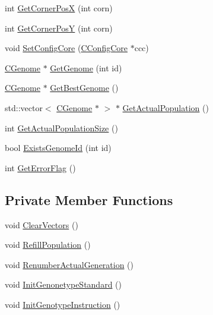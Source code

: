 \begin{DoxyCompactItemize}
\item 
int \hyperlink{classCGeneticAlgorithm_a7ed37537336f7ba8c77b8944e0a9052a}{GetCornerPosX} (int corn)
\item 
int \hyperlink{classCGeneticAlgorithm_afff003459489277c5b3944677b589a2b}{GetCornerPosY} (int corn)
\item 
void \hyperlink{classCGeneticAlgorithm_aa3b7378230c783d13431d50eaf3600c9}{SetConfigCore} (\hyperlink{classCConfigCore}{CConfigCore} $\ast$ccc)
\item 
\hyperlink{classCGenome}{CGenome} $\ast$ \hyperlink{classCGeneticAlgorithm_a85a3227b126b529d21b503e48fcf30ef}{GetGenome} (int id)
\item 
\hyperlink{classCGenome}{CGenome} $\ast$ \hyperlink{classCGeneticAlgorithm_a3fe743e1c6ca8f2387410063ce42fb5c}{GetBestGenome} ()
\item 
std::vector$<$ \hyperlink{classCGenome}{CGenome} $\ast$ $>$ $\ast$ \hyperlink{classCGeneticAlgorithm_a4066729944a04f47bf4c38257d330cb3}{GetActualPopulation} ()
\item 
int \hyperlink{classCGeneticAlgorithm_ad320e9d2f781d4f503f4edf66b6abc07}{GetActualPopulationSize} ()
\item 
bool \hyperlink{classCGeneticAlgorithm_a443bd2417f915c0aeb8119ff86844ad4}{ExistsGenomeId} (int id)
\item 
int \hyperlink{classCGeneticAlgorithm_a73bfc748e3d504395e6180d363a24536}{GetErrorFlag} ()
\end{DoxyCompactItemize}
\subsection*{Private Member Functions}
\begin{DoxyCompactItemize}
\item 
void \hyperlink{classCGeneticAlgorithm_a8b027efefd585c7c3b0cdbffeebc2705}{ClearVectors} ()
\item 
void \hyperlink{classCGeneticAlgorithm_a5cf2e61a6b805e5575bc1db1552c5aa5}{RefillPopulation} ()
\item 
void \hyperlink{classCGeneticAlgorithm_ae889e36cf0759ac986590e8f2756c18c}{RenumberActualGeneration} ()
\item 
void \hyperlink{classCGeneticAlgorithm_a0354c0ccdc8b9ec809a0561767172165}{InitGenonetypeStandard} ()
\item 
void \hyperlink{classCGeneticAlgorithm_a9910ee23c78afc77e960320026439291}{InitGenotypeInstruction} ()
\end{DoxyCompactItemize}
